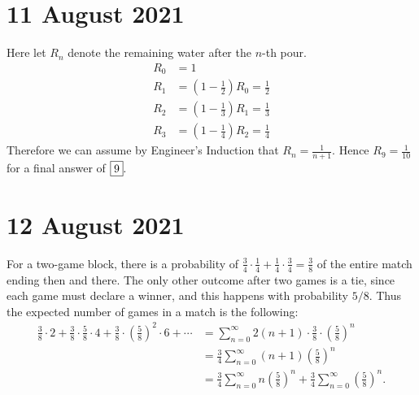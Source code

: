 \documentclass[letterpaper,oneside]{book}
\begin{document}
\section*{11 August 2021}
Here let $R_n$ denote the remaining water after the $n$-th pour.
\begin{align*}
    R_0 & = 1                                           \\
    R_1 & = \left(1-\frac{1}{2}\right)R_0 = \frac{1}{2} \\
    R_2 & = \left(1-\frac{1}{3}\right)R_1 = \frac{1}{3} \\
    R_3 & = \left(1-\frac{1}{4}\right)R_2 = \frac{1}{4}
\end{align*}
Therefore we can assume by Engineer's Induction that $R_n = \frac{1}{n+1}.$ Hence $R_9 = \frac{1}{10}$ for a final answer of $\fbox{9}.$

\section*{12 August 2021}
For a two-game block, there is a probability of $\displaystyle \frac34\cdot\frac14 + \frac14\cdot\frac34 = \frac38$ of the entire match ending then and there. The only other outcome after two games is a tie, since each game must declare a winner, and this happens with probability $5/8.$ Thus the expected number of games in a match is the following:
\begin{align*}
    \frac38\cdot2 + \frac38\cdot\frac58\cdot4+ \frac38\cdot\left(\frac58\right)^2\cdot6 + \cdots
     & = \sum_{n=0}^{\infty} 2(n+1)\cdot\frac38\cdot\left(\frac58\right)^n                                        \\
     & = \frac34 \sum_{n=0}^{\infty} (n+1)\left(\frac58\right)^n                                                  \\
     & = \frac34 \sum_{n=0}^{\infty} n\left(\frac58\right)^n + \frac34\sum_{n=0}^{\infty} \left(\frac58\right)^n.
\end{align*}
\end{document}
